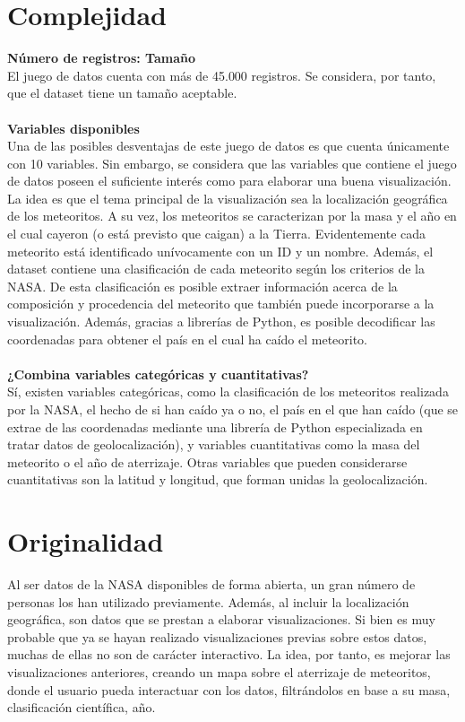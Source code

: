 \documentclass[12pt]{article}
\begin{document}
    \section{Complejidad}
    \textbf{Número de registros: Tamaño}\\
    El juego de datos cuenta con más de 45.000 registros. Se considera, por tanto, que el dataset tiene un tamaño aceptable.\\
    \\
    \textbf{Variables disponibles}\\
    Una de las posibles desventajas de este juego de datos es que cuenta únicamente con 10 variables. Sin embargo, se considera que las variables que contiene el juego de datos poseen el suficiente interés como para elaborar una buena visualización. La idea es que el tema principal de la visualización sea la localización geográfica de los meteoritos. A su vez, los meteoritos se caracterizan por la masa y el año en el cual cayeron (o está previsto que caigan) a la Tierra. Evidentemente cada meteorito está identificado unívocamente con un ID y un nombre. Además, el dataset contiene una clasificación de cada meteorito según los criterios de la NASA. De esta clasificación es posible extraer información acerca de la composición y procedencia del meteorito que también puede incorporarse a la visualización. Además, gracias a librerías de Python, es posible decodificar las coordenadas para obtener el país en el cual ha caído el meteorito.\\
    \\
    \textbf{¿Combina variables categóricas y cuantitativas?}\\
    Sí, existen variables categóricas, como la clasificación de los meteoritos realizada por la NASA, el hecho de si han caído ya o no, el país en el que han caído (que se extrae de las coordenadas mediante una librería de Python especializada en tratar datos de geolocalización), y variables cuantitativas como la masa del meteorito o el año de aterrizaje. Otras variables que pueden considerarse cuantitativas son la latitud y longitud, que forman unidas la geolocalización. 
    
    \section{Originalidad}
    Al ser datos de la NASA disponibles de forma abierta, un gran número de personas los han utilizado previamente. Además, al incluir la localización geográfica, son datos que se prestan a elaborar visualizaciones. Si bien es muy probable que ya se hayan realizado visualizaciones previas sobre estos datos, muchas de ellas no son de carácter interactivo. La idea, por tanto, es mejorar las visualizaciones anteriores, creando un mapa sobre el aterrizaje de meteoritos, donde el usuario pueda interactuar con los datos, filtrándolos en base a su masa, clasificación científica, año.
\end{document}
